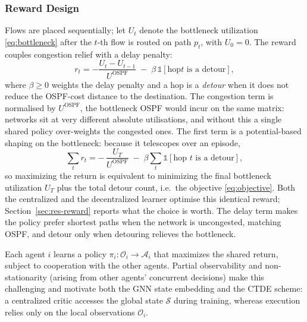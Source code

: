 \subsubsection{Reward Design}
Flows are placed sequentially; let $U_t$ denote the bottleneck utilization
\eqref{eq:bottleneck} after the $t$-th flow is routed on path $p_t$, with
$U_0=0$. The reward couples congestion relief with a delay penalty:
\begin{equation}\label{eq:reward}
r_t=-\frac{U_t-U_{t-1}}{U^{\mathrm{OSPF}}}\;-\;\beta\,\mathbb{1}\!\left[\text{hop
$t$ is a detour}\right],
\end{equation}
where $\beta\ge 0$ weights the delay penalty and a hop is a \emph{detour} when it
does not reduce the OSPF-cost distance to the destination. The congestion term is
normalised by $U^{\mathrm{OSPF}}$, the bottleneck OSPF would incur on the same
matrix: networks sit at very different absolute utilisations, and without this a
single shared policy over-weights the congested ones. The first term is a
potential-based shaping on the bottleneck: because it telescopes over an episode,
\begin{equation}\label{eq:telescope}
\sum_{t} r_t=-\,\frac{U_T}{U^{\mathrm{OSPF}}}\;-\;\beta\sum_{t}
\mathbb{1}\!\left[\text{hop $t$ is a detour}\right],
\end{equation}
so maximizing the return is equivalent to minimizing the final bottleneck
utilization $U_T$ plus the total detour count, i.e.\ the objective
\eqref{eq:objective}. Both the centralized and the decentralized learner optimise
this identical reward; Section~\ref{sec:res-reward} reports what the choice is
worth. The delay term makes the policy prefer shortest paths
when the network is uncongested, matching OSPF, and detour only when
detouring relieves the bottleneck.

Each agent $i$ learns a policy $\pi_i:\mathcal{O}_i\to\mathcal{A}_i$ that
maximizes the shared return, subject to cooperation with the other agents.
Partial observability and non-stationarity (arising from other agents'
concurrent decisions) make this challenging and motivate both the GNN state
embedding and the CTDE scheme: a centralized critic accesses the global state
$\mathcal{S}$ during training, whereas execution relies only on the local
observations $\mathcal{O}_i$.

